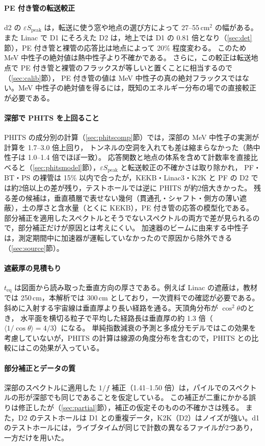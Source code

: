 \documentclass[a4paper,11pt]{ltjsarticle}
\newcommand{\teq}{t_{\mathrm{eq}}}
\newcommand{\eSpk}{\varepsilon S_{\mathrm{peak}}}
\begin{document}
\paragraph{PE 付き管の転送較正}
d2 の $\eSpk$ は，転送に使う窓や地点の選び方によって 27--55\,cm$^2$ の幅がある。
また Linac で D1 にそろえた D2 は，地上では D1 の 0.81 倍となり（\ref{sec:det}節），PE 付き管と裸管の応答比は地点によって 20\% 程度変わる。
このため MeV 中性子の絶対値は熱中性子より不確かである。
さらに，この較正は転送地点で PE 付き管と裸管のフラックスが等しいと置くことに相当するので（\ref{sec:calib}節），
PE 付き管の値は MeV 中性子の真の絶対フラックスではない。MeV 中性子の絶対値を得るには，既知のエネルギー分布の場での直接較正が必要である。

\paragraph{深部で PHITS を上回ること}
PHITS の成分別の計算（\ref{sec:phitscomp}節）では，深部の MeV 中性子の実測が計算を 1.7--3.0 倍上回り，
トンネルの空洞を入れても差は縮まらなかった（熱中性子は 1.0--1.4 倍でほぼ一致）。
応答関数と地点の体系を含めて計数率を直接比べると（\ref{sec:phitsmodel}節），$\eSpk$ と転送較正の不確かさは取り除かれ，
PF・BT・PS の裸管は 15\% 以内で合ったが，KEKB・Linac3・K2K と PF の D2 では約2倍以上の差が残り，テストホールでは逆に PHITS が約2倍大きかった。
残る差の候補は，垂直積層で表せない幾何（貫通孔・シャフト・側方の薄い遮蔽），土の厚さと含水量（とくに KEKB），PE 付き管の応答の模型化である。
部分補正を適用したスペクトルとそうでないスペクトルの両方で差が見られるので，部分補正だけが原因とは考えにくい。
加速器のビームに由来する中性子は，測定期間中に加速器が運転していなかったので原因から除外できる（\ref{sec:source}節）。

\paragraph{遮蔽厚の見積もり}
$\teq$ は図面から読み取った垂直方向の厚さである。例えば Linac の遮蔽は，教材では 250\,cm，本解析では 300\,cm としており，一次資料での確認が必要である。
斜めに入射する宇宙線は垂直厚より長い経路を通る。天頂角分布が $\cos^2\theta$\cite{Gaisser2016}のとき，
水平面を横切る粒子で平均した経路長は垂直厚の約 1.3 倍（$\langle1/\cos\theta\rangle=4/3$）になる。
単純指数減衰の予測と多成分モデルではこの効果を考慮していないが，PHITS の計算は線源の角度分布を含むので，PHITS との比較にはこの効果が入っている。

\paragraph{部分補正とデータの質}
深部のスペクトルに適用した $1/f$ 補正（1.41--1.50 倍）は，パイルでのスペクトルの形が深部でも同じであることを仮定している。
この補正が二重にかかる誤りは修正したが（\ref{sec:partial}節），補正の仮定そのものの不確かさは残る。
また，D2 のテストホールは D1 との重複データ，K2K（D2）はノイズが強い。d1 のテストホールには，ライブタイムが同じで計数の異なるファイルが2つあり，一方だけを用いた。
\end{document}
